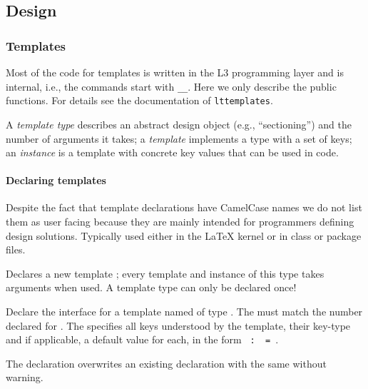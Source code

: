\documentclass{l3in2edoc}
\let\subsubsubsection\paragraph
\begin{document}

\subsection{Design}

\subsubsection{Templates}

Most of the code for templates is written in the L3 programming layer
and is internal, i.e., the commands start with \texttt{\_\_}. Here we only
describe the public functions. For details see the documentation of
\texttt{lttemplates}.

A \emph{template type} describes an abstract design object (e.g.,
\enquote{sectioning}) and the number of arguments it takes; a
\emph{template} implements a type with a set of keys; an
\emph{instance} is a template with concrete key values that can be
used in code.


\subsubsubsection{Declaring templates}

Despite the fact that template declarations have CamelCase names we do
not list them as user facing because they are mainly intended for
programmers defining design solutions. Typically used either in the
\LaTeX{} kernel or in class or package files.

\begin{function}[]
  {
    \NewTemplateType
  }
  \begin{syntax}
      
  \end{syntax}
  Declares a new template ; every template and instance of
  this type takes  arguments when used.
  A template type can only be declared once!
\end{function}

\begin{function}[]
  {
    \DeclareTemplateInterface
  }
  \begin{syntax}
        
  \end{syntax}
  Declare the interface for a template named  of type
  . The  must match the number
  declared for .
%
  The  specifies all keys understood by the template,
  their key-type and if applicable, a default value for each, in the
  form \texttt{\,:\,}\texttt{\,=\,}.

  The declaration overwrites an existing declaration with the same
   without warning.
\end{function}
\end{document}
